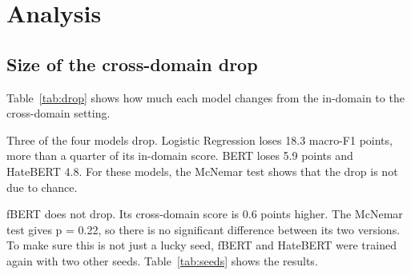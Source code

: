 \documentclass[11pt,a4paper]{article}
\begin{document}
\section{Analysis}

\subsection{Size of the cross-domain drop}

Table~\ref{tab:drop} shows how much each model changes from the in-domain to the cross-domain setting.

\begin{table}[H]
\centering
\caption{Change in macro-F1 and in offensive-class F1 from in-domain to cross-domain. Positive values are drops. The relative drop is in percent of the in-domain macro-F1. The McNemar p-value shows if the in-domain and cross-domain models make different errors on the same 860 tweets.}
\label{tab:drop}
\end{table}

Three of the four models drop. Logistic Regression loses 18.3 macro-F1 points, more than a quarter of its in-domain score. BERT loses 5.9 points and HateBERT 4.8. For these models, the McNemar test shows that the drop is not due to chance.

fBERT does not drop. Its cross-domain score is 0.6 points higher. The McNemar test gives p = 0.22, so there is no significant difference between its two versions. To make sure this is not just a lucky seed, fBERT and HateBERT were trained again with two other seeds. Table~\ref{tab:seeds} shows the results.
\end{document}
